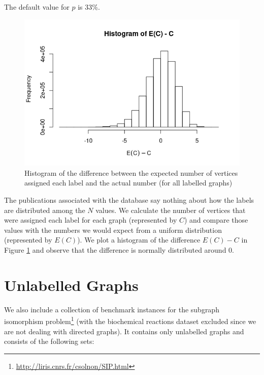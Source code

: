 \documentclass{l4proj}
\theoremstyle{definition}
\theoremstyle{remark}
\begin{document}
The default value for $p$ is 33\%.

\begin{figure}
  \centering
  \includegraphics[scale=0.7]{images/labelling_histogram.png}
  \caption{Histogram of the difference between the expected number of vertices
    assigned each label and the actual number (for all labelled graphs)}
  \label{figure:labelling_histogram}
\end{figure}

The publications associated with the database \cite{foggia2001-2, DBLP:journals/prl/SantoFSV03}
say nothing about how the labels are distributed among the $N$ values. We
calculate the number of vertices that were assigned each label for each graph
(represented by $C$) and compare those values with the numbers we would expect
from a uniform distribution (represented by $E(C)$). We plot a histogram of the
difference $E(C) - C$ in Figure \ref{figure:labelling_histogram} and observe
that the difference is normally distributed around 0.

\section{Unlabelled Graphs} \label{sec:unlabelled}
We also include a collection of benchmark instances for the subgraph isomorphism
problem\footnote{\url{http://liris.cnrs.fr/csolnon/SIP.html}} (with the
biochemical reactions dataset excluded since we are not dealing with directed
graphs). It contains only unlabelled graphs and consists of the following sets:
\end{document}
